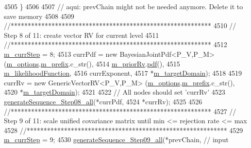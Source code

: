\begin{DoxyCode}
{{4505     \}
4506 
4507     \textcolor{comment}{// aqui: prevChain might not be needed anymore. Delete it to save memory}
4508 
4509     \textcolor{comment}{//***********************************************************}
4510     \textcolor{comment}{// Step 8 of 11: create vector RV for current level}
4511     \textcolor{comment}{//***********************************************************}
4512     \hyperlink{class_q_u_e_s_o_1_1_m_l_sampling_a1b1f8ccb4823bdfa26ec652f0807c63e}{m\_currStep} = 8;
4513     currPdf = \textcolor{keyword}{new} BayesianJointPdf<P\_V,P\_M> (\hyperlink{class_q_u_e_s_o_1_1_m_l_sampling_af8504cc57ec72b3c52833826b2bfff8e}{m\_options}.\hyperlink{class_q_u_e_s_o_1_1_m_l_sampling_options_a1d3d48598e0b59b46337ce66a52671a5}{m\_prefix}.c\_str(),
4514                                                     \hyperlink{class_q_u_e_s_o_1_1_m_l_sampling_aa45e9c06bd51cae0dc2294af1831c158}{m\_priorRv}.\hyperlink{class_q_u_e_s_o_1_1_base_vector_r_v_a3206740e05e0c64a88273029e963b185}{pdf}(),
4515                                                     \hyperlink{class_q_u_e_s_o_1_1_m_l_sampling_ab08c3059d23460db49b229aa88bd4e70}{m\_likelihoodFunction},
4516                                                     currExponent,
4517                                                     *\hyperlink{class_q_u_e_s_o_1_1_m_l_sampling_a21525858e93a7d9654fdf68c8ac25576}{m\_targetDomain});
4518 
4519     currRv = \textcolor{keyword}{new} GenericVectorRV<P\_V,P\_M> (\hyperlink{class_q_u_e_s_o_1_1_m_l_sampling_af8504cc57ec72b3c52833826b2bfff8e}{m\_options}.\hyperlink{class_q_u_e_s_o_1_1_m_l_sampling_options_a1d3d48598e0b59b46337ce66a52671a5}{m\_prefix}.c\_str(),
4520                                                   *\hyperlink{class_q_u_e_s_o_1_1_m_l_sampling_a21525858e93a7d9654fdf68c8ac25576}{m\_targetDomain});
4521 
4522     \textcolor{comment}{// All nodes should set 'currRv'}
4523     \hyperlink{class_q_u_e_s_o_1_1_m_l_sampling_a754bc11c7802f627fece9f063450739a}{generateSequence\_Step08\_all}(*currPdf,
4524                                 *currRv);
4525 
4526     \textcolor{comment}{//***********************************************************}
4527     \textcolor{comment}{// Step 9 of 11: scale unified covariance matrix until min <= rejection rate <= max}
4528     \textcolor{comment}{//***********************************************************}
4529     \hyperlink{class_q_u_e_s_o_1_1_m_l_sampling_a1b1f8ccb4823bdfa26ec652f0807c63e}{m\_currStep} = 9;
4530     \hyperlink{class_q_u_e_s_o_1_1_m_l_sampling_a26892288f3b1902d78ba049b96579a08}{generateSequence\_Step09\_all}(*prevChain,                        \textcolor{comment}{// input}
}}
\end{DoxyCode}
